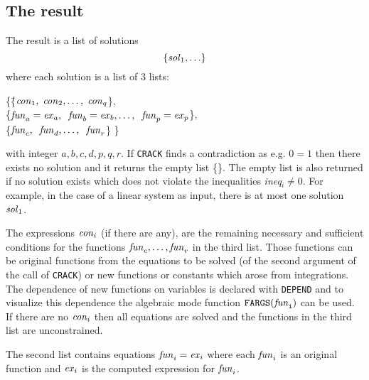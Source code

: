 \subsection{The result}  
The result is a list of solutions 
\[      \{{\it sol}_1, \ldots \}  \]
where each solution is a list of 3 lists:
\begin{tabbing}
       \{\=\{${\it con}_1, \; {\it con}_2, \ldots , \; {\it con}_q$\}, \\
         \>\{${\it fun}_a={\it ex}_a, \;\;
{\it fun}_b={\it ex}_b, \ldots , \;\; {\it fun}_p={\it ex}_p$\},\=  \\
         \>\{${\it fun}_c, \;\; {\it fun}_d, \ldots , \;\; {\it fun}_r$\} \>\}
\end{tabbing}      
with integer $a, b, c, d, p, q, r.$
If {\tt CRACK} finds a contradiction as e.g. $0=1$ then there exists no
solution and it returns the empty list \{\}.
The empty list is also returned if no solution exists 
which does not violate the inequalities
{\it ineq}$_i \neq 0.$ 
For example, in the case of a linear system as input, there is
at most one solution ${\it sol}_1$.

The expressions ${\it con}_i$ (if there are any), are the
remaining necessary and sufficient conditions for the functions
${\it fun}_c,\ldots,{\it fun}_r$ in the third list.  Those
functions can be original functions from the equations to be
solved (of the second argument of the call of {\tt CRACK}) or new
functions or constants which arose from integrations. 
The dependence of new functions on variables is declared with {\tt DEPEND}
and to visualize this dependence the algebraic mode function
${\tt FARGS({\it fun}_i)}$ can be used.
If there are no ${\it con}_i$ then all equations are solved and the
functions in the third list are unconstrained.  

The second list contains
equations ${\it fun}_i={\it ex}_i$ where each ${\it fun}_i$ is an
original function and ${\it ex}_i$ is the computed expression
for ${\it fun}_i$.


